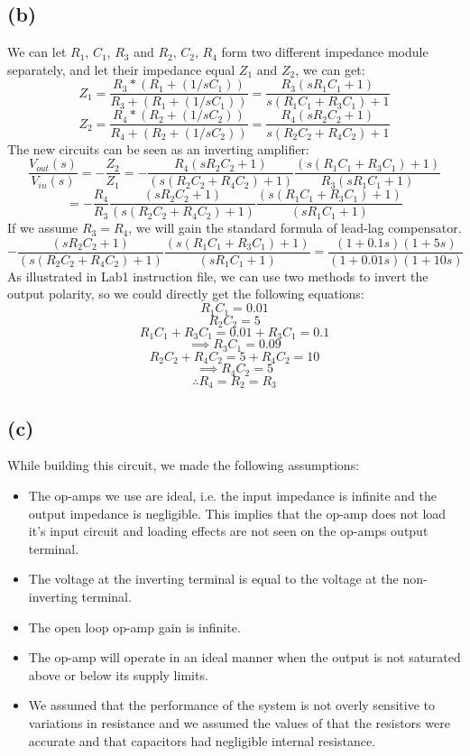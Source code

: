 \documentclass[letterpaper]{article}
\begin{document}
\subsection*{(b)}
We can let $R_1$, $C_1$, $R_3$ and $R_2$, $C_2$, $R_4$ form two different impedance module separately, and let their impedance equal $Z_1$ and $Z_2$, we can get:
$$Z_1 = \frac{R_3 * (R_1 + (1/sC_1))}{R_3 + (R_1 + (1/sC_1))} = \frac{R_3(sR_1C_1 +1)}{s(R_1C_1 + R_3C_1) + 1}$$
$$Z_2 = \frac{R_4 * (R_2 + (1/sC_2))}{R_4 + (R_2 + (1/sC_2))} = \frac{R_4(sR_2C_2 +1)}{s(R_2C_2 + R_4C_2) + 1}$$
The new circuits can be seen as an inverting amplifier:
$$\frac{V_{out}(s)}{V_{in}(s)} = - \frac{Z_2}{Z_1} = -  \frac{R_4(sR_2C_2 +1)}{(s(R_2C_2 + R_4C_2) + 1)}\frac{(s(R_1C_1 + R_3C_1) + 1)}{R_3(sR_1C_1 +1)} $$
$$=  -  \frac{R_4}{R_3}\frac{(sR_2C_2 +1)}{(s(R_2C_2 + R_4C_2) + 1)}\frac{(s(R_1C_1 + R_3C_1) + 1)}{(sR_1C_1 +1)} $$
If we assume $R_3 = R_4$, we will gain the standard formula of lead-lag compensator.
$$ - \frac{(sR_2C_2 +1)}{(s(R_2C_2 + R_4C_2) + 1)}\frac{(s(R_1C_1 + R_3C_1) + 1)}{(sR_1C_1 +1)}  = \frac{(1+0.1s)(1 + 5s)}{(1+0.01s)(1 + 10s)}$$
As illustrated in Lab1 instruction file, we can use two methods to invert the output polarity, so we could directly get the following equations:
$$R_1C_1 = 0.01$$
$$R_2C_2 = 5$$
$$R_1C_1 + R_3C_1 = 0.01 + R_3C_1 = 0.1$$
$$\implies R_3C_1 = 0.09$$
$$R_2C_2 + R_4C_2 = 5 + R_4C_2 = 10$$
$$\implies R_4C_2 = 5$$
$$\therefore R_4 = R_2 = R_3$$
\subsection*{(c)}
While building this circuit, we made the following assumptions:
\begin{itemize}
\item The op-amps we use are ideal, i.e. the input impedance is infinite and the output impedance is negligible. This implies that the op-amp does not load it's input circuit and loading effects are not seen on the op-amps output terminal.

\item The voltage at the inverting terminal is equal to the voltage at the non-inverting terminal.

\item The open loop op-amp gain is infinite.

\item The op-amp will operate in an ideal manner when the output is not saturated above or below its supply limits.

\item We assumed that the performance of the system is not overly sensitive to variations in resistance and we assumed the values of that the resistors were accurate and that capacitors had negligible internal resistance.
\end{itemize}
\end{document}

